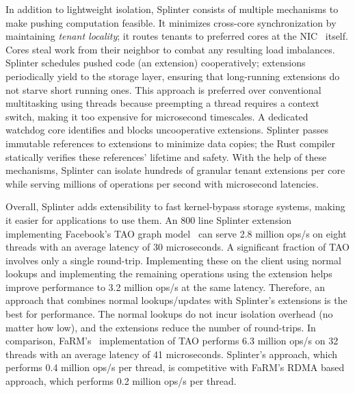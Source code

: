 In addition to lightweight isolation, Splinter consists of multiple
mechanisms to make pushing computation feasible.
%
It minimizes cross-core synchronization
by maintaining \emph{tenant locality};
%
it routes tenants
to preferred cores at the NIC~\cite{flow-director} itself.
%
Cores
steal work from
their neighbor to combat any resulting load imbalances.
%
Splinter schedules pushed code (an extension) cooperatively; extensions
periodically yield to the storage layer, ensuring that long-running
extensions do not starve short running ones.
%
This
approach is preferred over conventional multitasking using threads
because preempting a thread requires a context switch, making it too
expensive for microsecond timescales.
%
A dedicated watchdog core identifies and blocks uncooperative
extensions.
%
Splinter passes immutable references to extensions to minimize data
copies; the Rust compiler statically verifies these references' lifetime
and safety.
%
With the help of these mechanisms, Splinter can isolate
hundreds of granular tenant extensions per core while serving millions of
operations per second with microsecond latencies.

Overall, Splinter adds extensibility to fast kernel-bypass storage
systems, making it easier for applications to use them.
%
An 800 line Splinter extension implementing Facebook’s TAO graph
model~\cite{tao-2013}
can serve 2.8 million ops/s on eight threads with an average latency of
30 microseconds.
%
A significant fraction of TAO involves only a single
round-trip.
%
Implementing these on the client using normal lookups and
implementing the remaining operations using the extension helps improve
performance to 3.2 million ops/s at the same latency.
%
Therefore, an
approach that combines normal lookups/updates with Splinter’s extensions
is the best for performance.
%
The normal lookups do not incur isolation
overhead (no matter how low), and the extensions reduce the number of
round-trips.
%
In comparison, FaRM’s~\cite{farm-2014} implementation of TAO performs
6.3 million
ops/s on 32 threads with an average latency of 41 microseconds.
%
Splinter’s approach, which performs 0.4 million ops/s per thread,
is competitive with FaRM’s RDMA based approach, which performs 0.2 million
ops/s per thread.
